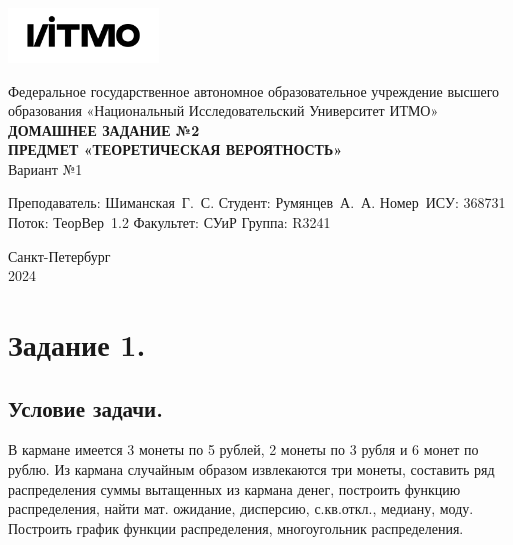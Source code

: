 \documentclass[a4paper, 12pt]{article}
\begin{document}
    \begin{titlepage}

        \begin{center}
        \includegraphics[width=0.3\textwidth]{itmo.png} %
        \vfill

        Федеральное государственное автономное образовательное учреждение высшего образования
        «Национальный Исследовательский Университет ИТМО»\\

        \vfill
        {\large\bf ДОМАШНЕЕ ЗАДАНИЕ №2}\\
        {\large\bf ПРЕДМЕТ «ТЕОРЕТИЧЕСКАЯ ВЕРОЯТНОСТЬ»}\\
        Вариант №1
        \vfill

        \begin{flushright}
            \begin{minipage}{.45\textwidth}
            {
                \hbox{Преподаватель:}
                \hbox{Шиманская Г. С.}
                \hbox{Студент:}
                \hbox{Румянцев А. А.}
                \hbox{}
                \hbox{Номер ИСУ:}
                \hbox{368731}
                \hbox{Поток:}
                \hbox{ТеорВер 1.2}
                \hbox{Факультет:}
                \hbox{СУиР}
                \hbox{Группа:}
                \hbox{R3241}
            }
            \end{minipage}
        \end{flushright}

        \vfill

        Санкт-Петербург\\
        2024
        \end{center}
    \end{titlepage}

    \tableofcontents

    \newpage
    \section{Задание 1.}
    \subsection{Условие задачи.}
    В кармане имеется 3 монеты по 5 рублей, 2 монеты по 3 рубля и 6 монет 
    по рублю. Из кармана случайным образом извлекаются три монеты, 
    составить ряд распределения суммы вытащенных из кармана денег, 
    построить функцию распределения, найти мат. ожидание, дисперсию, 
    с.кв.откл., медиану, моду. Построить график функции распределения, 
    многоугольник распределения.
\end{document}
